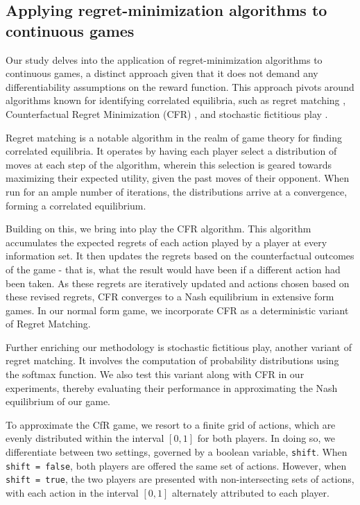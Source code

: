 \documentclass[preprint,12pt,authoryear]{elsarticle}
\theoremstyle{definition}
\begin{document}
\subsection{Applying regret-minimization algorithms to continuous games}

Our study delves into the application of regret-minimization algorithms to continuous games, a distinct approach given that it does not demand any differentiability assumptions on the reward function. This approach pivots around algorithms known for identifying correlated equilibria, such as regret matching \citep{Hart1997-nk}, Counterfactual Regret Minimization (CFR) \citep{neller2013introduction}, and stochastic fictitious play \citep{fudenberg1993learning}.

Regret matching is a notable algorithm in the realm of game theory for finding correlated equilibria. It operates by having each player select a distribution of moves at each step of the algorithm, wherein this selection is geared towards maximizing their expected utility, given the past moves of their opponent. When run for an ample number of iterations, the distributions arrive at a convergence, forming a correlated equilibrium.

Building on this, we bring into play the CFR algorithm. This algorithm accumulates the expected regrets of each action played by a player at every information set. It then updates the regrets based on the counterfactual outcomes of the game - that is, what the result would have been if a different action had been taken. As these regrets are iteratively updated and actions chosen based on these revised regrets, CFR converges to a Nash equilibrium in extensive form games. In our normal form game, we incorporate CFR as a deterministic variant of Regret Matching.

Further enriching our methodology is stochastic fictitious play, another variant of regret matching. It involves the computation of probability distributions using the softmax function. We also test this variant along with CFR in our experiments, thereby evaluating their performance in approximating the Nash equilibrium of our game.

To approximate the CfR game, we resort to a finite grid of actions, which are evenly distributed within the interval $[0, 1]$ for both players. In doing so, we differentiate between two settings, governed by a boolean variable, \texttt{shift}. When \texttt{shift = false}, both players are offered the same set of actions. However, when \texttt{shift = true}, the two players are presented with non-intersecting sets of actions, with each action in the interval $[0, 1]$ alternately attributed to each player.
\end{document}
